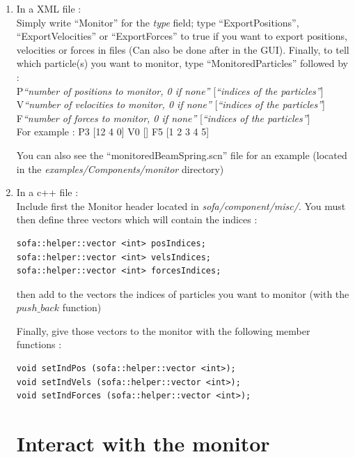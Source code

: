 \documentclass[a4paper,10pt]{article}
\begin{document}
\begin{enumerate}
	\item In a XML file :\\
	Simply write ``Monitor'' for the \textit{type} field; type ``ExportPositions'', ``ExportVelocities'' or ``ExportForces''
	to true if you want to export positions, velocities or forces in files (Can also be done after in the GUI).
	Finally, to tell which particle(s) you want to monitor, type ``MonitoredParticles'' followed by :\\

	P\textit{``number of positions to monitor, 0 if none''} [\textit{``indices of the particles''}] \\
	V\textit{``number of velocities to monitor, 0 if none''} [\textit{``indices of the particles''}] \\
	F\textit{``number of forces to monitor, 0 if none''} [\textit{``indices of the particles''}] \\

	For example :
	P3 [12 4 0] V0 [] F5 [1 2 3 4 5]

	You can also see the ``monitoredBeamSpring.scn'' file for an example (located in the \textit{examples/Components/monitor} directory)

	\item In a c++ file :\\
	Include first the Monitor header located in \textit{sofa/component/misc/}.
	You must then define three vectors which will contain the indices :

\begin{lstlisting}
sofa::helper::vector <int> posIndices;
sofa::helper::vector <int> velsIndices;
sofa::helper::vector <int> forcesIndices;
\end{lstlisting}

	then add to the vectors the indices of particles you want to monitor (with the $push\_back$ function)

	Finally, give those vectors to the monitor with the following member functions :

\begin{lstlisting}
void setIndPos (sofa::helper::vector <int>);
void setIndVels (sofa::helper::vector <int>);
void setIndForces (sofa::helper::vector <int>);
\end{lstlisting}

\section{Interact with the monitor}


\end{enumerate}
\end{document}
